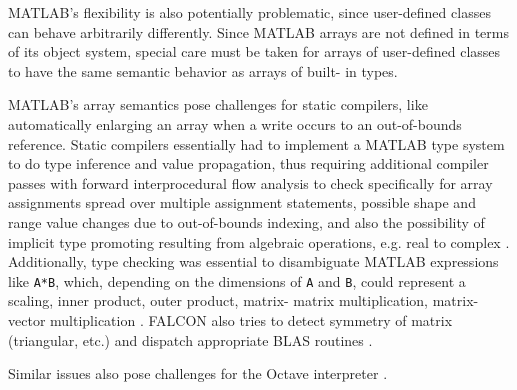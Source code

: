 \documentclass[preprint]{sigplanconf}
\newcommand{\MATLAB}{\textsc{MATLAB}}
\newcommand{\Mathematica}{\textit{Mathematica}}
\newcommand{\code}[1]{\texttt{#1}}
\begin{document}
\begin{enumerate}
\MATLAB's flexibility is also potentially problematic, since user-defined
classes can behave arbitrarily differently. Since \MATLAB{} arrays are not
defined in terms of its object system, special care must be taken for arrays
of user-defined classes to have the same semantic behavior as arrays of built-
in types.


\MATLAB's array semantics pose challenges for static compilers, like
automatically enlarging an array when a write occurs to an out-of-bounds
reference. Static compilers essentially had to implement a \MATLAB{} type
system to do type inference and value propagation, thus requiring additional
compiler passes with forward interprocedural flow analysis to check
specifically for array assignments spread over multiple assignment
statements, possible shape and range value changes due to out-of-bounds
indexing, and also the possibility of implicit type promoting resulting from
algebraic operations, e.g. real to complex \cite{Rose:1999tt, Li:2013mf}.
Additionally, type checking was essential to disambiguate \MATLAB{}
expressions like \code{A*B}, which, depending on the dimensions of \code{A} and
\code{B}, could represent a scaling, inner product, outer product, matrix-
matrix multiplication, matrix-vector multiplication \cite{Rose:1999tt}. FALCON
also tries to detect symmetry of matrix (triangular, etc.) and dispatch
appropriate BLAS routines \cite{Rose:1999tt}.


Similar issues also pose challenges for the Octave interpreter \cite{Eaton:2001op}.

%


\end{enumerate}
\end{document}
